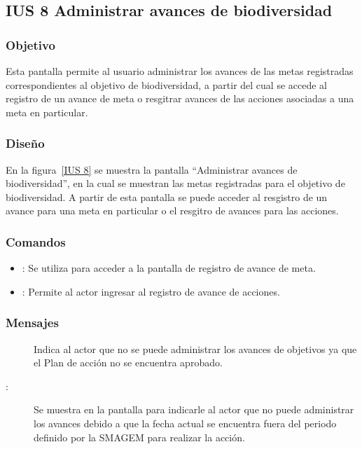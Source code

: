 \subsection{IUS 8 Administrar avances de biodiversidad}

\subsubsection{Objetivo}
    
Esta pantalla permite al usuario  administrar los avances de las metas registradas correspondientes al objetivo de biodiversidad, a partir del cual se accede al registro de un avance de meta o resgitrar avances de las acciones asociadas a una meta en particular.

\subsubsection{Diseño}

    En la figura~\ref{IUS 8} se muestra la pantalla ``Administrar avances de biodiversidad'', en la cual se muestran las metas registradas para el objetivo de biodiversidad. A partir de esta pantalla se puede acceder al resgistro de un avance para una meta en particular o el resgitro de avances para las acciones. 



\subsubsection{Comandos}
    \begin{itemize}
    \item {}: Se utiliza para acceder a la pantalla de registro de avance de meta.
    \item {}: Permite al actor ingresar al registro de avance de acciones.
    \end{itemize}

\subsubsection{Mensajes}

    \begin{description}
    \item[] Indica al actor que no se puede administrar los avances de objetivos ya que el Plan de acción no se encuentra aprobado.

    \item [:] Se muestra en la pantalla  para indicarle al actor que no puede administrar los avances debido a que la fecha actual se encuentra fuera del periodo definido por la SMAGEM para realizar la acción.
    \end{description}
